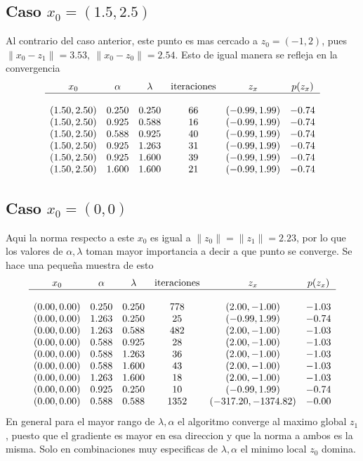 \documentclass[letterpaper]{article}
\begin{document}
\subsection*{Caso \(x_0 = (1.5, 2.5)\)}
Al contrario del caso anterior, este punto es mas cercado a \(z_0 = (-1,
2)\), pues \(\lVert x_0 - z_1 \rVert = 3.53,\ \lVert x_0 - z_0 \rVert =
2.54\). Esto de igual manera se refleja en la convergencia
\[
\begin{array}{c c c c c c}
  x_0 & \alpha & \lambda & \text{iteraciones} & z_x & p(z_{x}) \\
  \hline \\
  (1.50, 2.50) & 0.250 & 0.250 & 66 & (-0.99, 1.99) & -0.74 \\
  (1.50, 2.50) & 0.925 & 0.588 & 16 & (-0.99, 1.99) & -0.74 \\
  (1.50, 2.50) & 0.588 & 0.925 & 40 & (-0.99, 1.99) & -0.74 \\
  (1.50, 2.50) & 0.925 & 1.263 & 31 & (-0.99, 1.99) & -0.74 \\
  (1.50, 2.50) & 0.925 & 1.600 & 39 & (-0.99, 1.99) & -0.74 \\
  (1.50, 2.50) & 1.600 & 1.600 & 21 & (-0.99, 1.99) & -0.74 \\
\end{array}
\]

\subsection*{Caso \(x_0 = (0,0)\)}
Aqui la norma respecto a este \(x_0\) es igual a \(\lVert z_0 \rVert =
\lVert z_1 \rVert = 2.23 \), por lo que los valores de \(\alpha,
\lambda\) toman mayor importancia a decir a que punto se converge. Se
hace una pequeña muestra de esto
\[
\begin{array}{c c c c c c}
  x_0 & \alpha & \lambda & \text{iteraciones} & z_x & p(z_{x}) \\
  \hline \\
  (0.00, 0.00) & 0.250 & 0.250 & 778  & (2.00, -1.00)       & -1.03 \\
  (0.00, 0.00) & 1.263 & 0.250 & 25   & (-0.99, 1.99)       & -0.74 \\
  (0.00, 0.00) & 1.263 & 0.588 & 482  & (2.00, -1.00)       & -1.03 \\
  (0.00, 0.00) & 0.588 & 0.925 & 28   & (2.00, -1.00)       & -1.03 \\
  (0.00, 0.00) & 0.588 & 1.263 & 36   & (2.00, -1.00)       & -1.03 \\
  (0.00, 0.00) & 0.588 & 1.600 & 43   & (2.00, -1.00)       & -1.03 \\
  (0.00, 0.00) & 1.263 & 1.600 & 18   & (2.00, -1.00)       & -1.03 \\
  (0.00, 0.00) & 0.925 & 0.250 & 10   & (-0.99, 1.99)       & -0.74 \\
  (0.00, 0.00) & 0.588 & 0.588 & 1352 & (-317.20, -1374.82) & -0.00 \\
\end{array}
\]
En general para el mayor rango de \(\lambda,\alpha\) el algoritmo
converge al maximo global \(z_1\), puesto que el gradiente es mayor en
esa direccion y que la norma a ambos es la misma. Solo en combinaciones
muy especificas de \(\lambda, \alpha\) el minimo local \(z_0\) domina.
\end{document}
